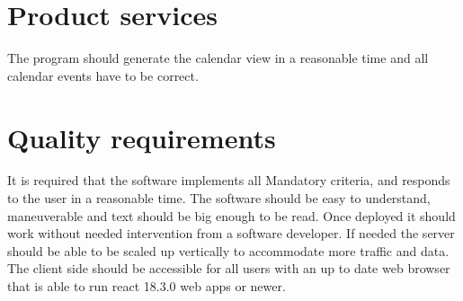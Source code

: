 \documentclass[]{article}
\begin{document}
\section{Product services}
	The program should generate the calendar view in a reasonable time and all calendar events have to be correct.
\section{Quality requirements}
	It is required that the software implements all Mandatory criteria, and responds to the user in a reasonable time. The software should be easy to understand, maneuverable and text should be big enough to be read. Once deployed it should work without needed intervention from a software developer. If needed the server should be able to be scaled up vertically to accommodate more traffic and data. The client side should be accessible for all users with an up to date web browser that is able to run react 18.3.0 web apps or newer.
\newpage
\end{document}

